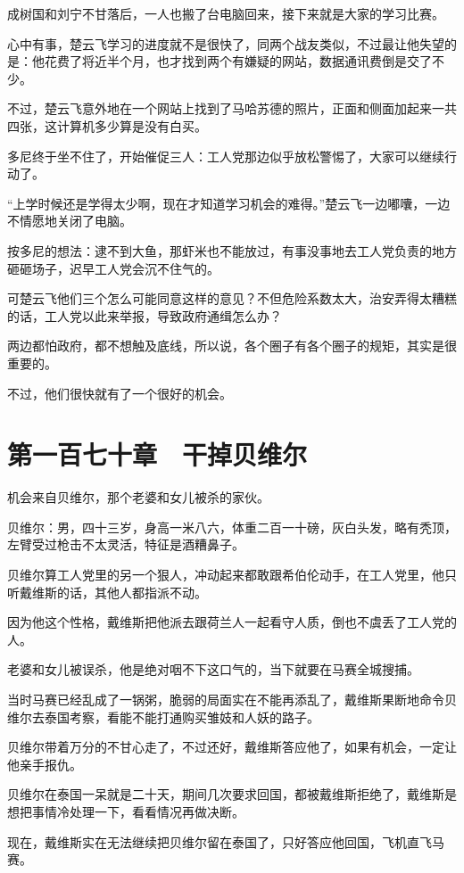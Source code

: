 成树国和刘宁不甘落后，一人也搬了台电脑回来，接下来就是大家的学习比赛。

心中有事，楚云飞学习的进度就不是很快了，同两个战友类似，不过最让他失望的是：他花费了将近半个月，也才找到两个有嫌疑的网站，数据通讯费倒是交了不少。

不过，楚云飞意外地在一个网站上找到了马哈苏德的照片，正面和侧面加起来一共四张，这计算机多少算是没有白买。

多尼终于坐不住了，开始催促三人：工人党那边似乎放松警惕了，大家可以继续行动了。

“上学时候还是学得太少啊，现在才知道学习机会的难得。”楚云飞一边嘟囔，一边不情愿地关闭了电脑。

按多尼的想法：逮不到大鱼，那虾米也不能放过，有事没事地去工人党负责的地方砸砸场子，迟早工人党会沉不住气的。

可楚云飞他们三个怎么可能同意这样的意见？不但危险系数太大，治安弄得太糟糕的话，工人党以此来举报，导致政府通缉怎么办？

两边都怕政府，都不想触及底线，所以说，各个圈子有各个圈子的规矩，其实是很重要的。

不过，他们很快就有了一个很好的机会。

\section{第一百七十章　干掉贝维尔}

机会来自贝维尔，那个老婆和女儿被杀的家伙。

贝维尔：男，四十三岁，身高一米八六，体重二百一十磅，灰白头发，略有秃顶，左臂受过枪击不太灵活，特征是酒糟鼻子。

贝维尔算工人党里的另一个狠人，冲动起来都敢跟希伯伦动手，在工人党里，他只听戴维斯的话，其他人都指派不动。

因为他这个性格，戴维斯把他派去跟荷兰人一起看守人质，倒也不虞丢了工人党的人。

老婆和女儿被误杀，他是绝对咽不下这口气的，当下就要在马赛全城搜捕。

当时马赛已经乱成了一锅粥，脆弱的局面实在不能再添乱了，戴维斯果断地命令贝维尔去泰国考察，看能不能打通购买雏妓和人妖的路子。

贝维尔带着万分的不甘心走了，不过还好，戴维斯答应他了，如果有机会，一定让他亲手报仇。

贝维尔在泰国一呆就是二十天，期间几次要求回国，都被戴维斯拒绝了，戴维斯是想把事情冷处理一下，看看情况再做决断。

现在，戴维斯实在无法继续把贝维尔留在泰国了，只好答应他回国，飞机直飞马赛。

